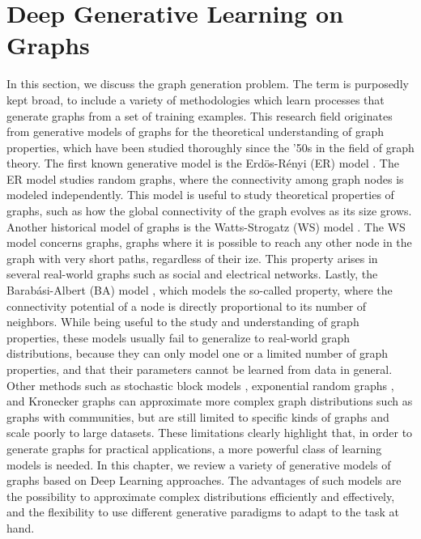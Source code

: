\section{Deep Generative Learning on Graphs}
In this section, we discuss the graph generation problem. The term  is purposedly kept broad, to include a variety of methodologies which learn processes that generate graphs from a set of training examples. This research field originates from generative models of graphs for the theoretical understanding of graph properties, which have been studied thoroughly since the '50s in the field of graph theory. The first known generative model is the  Erd\"{o}s-R\'{e}nyi (ER) model \cite{erdos1959randomgraphs}. The ER model studies random graphs, where the connectivity among graph nodes is modeled independently. This model is useful to study theoretical properties of graphs, such as how the global connectivity of the graph evolves as its size grows. Another historical model of graphs is the  Watts-Strogatz (WS)  model \cite{watts1998smallworld}. The WS model concerns  graphs, \ie graphs where it is possible to reach any other node in the graph with very short paths, regardless of their ize. This property arises in several real-world graphs such as social and electrical networks. Lastly, the Barab{\'a}si-Albert (BA) model \cite{barabasi1999prefatt}, which models the so-called  property, where the connectivity potential of a node is directly proportional to its number of neighbors. While being useful to the study and understanding of graph properties, these models usually fail to generalize to real-world graph distributions, because they can only model one or a limited number of graph properties, and that their parameters cannot be learned from data in general. Other methods such as stochastic block models \citep{airoldi2008mixedstochasticblock}, exponential random graphs \citep{robins2007exponentialrandomgraphs}, and Kronecker graphs \citep{leskovec2010kronecker} can approximate more complex graph distributions such as graphs with communities, but are still limited to specific kinds of graphs and scale poorly to large datasets.
These limitations clearly highlight that, in order to generate graphs for practical applications, a more powerful class of learning models is needed. In this chapter, we review a variety of generative models of graphs based on Deep Learning approaches. The advantages of such models are the possibility to approximate complex distributions efficiently and effectively, and the flexibility to use different generative paradigms to adapt to the task at hand.

